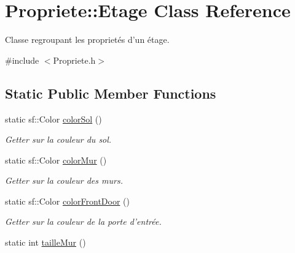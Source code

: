 \hypertarget{classPropriete_1_1Etage}{\section{Propriete\-:\-:Etage Class Reference}
\label{classPropriete_1_1Etage}
}


Classe regroupant les proprietés d'un étage.  




{\ttfamily \#include $<$Propriete.\-h$>$}

\subsection*{Static Public Member Functions}
\begin{DoxyCompactItemize}
\item 
\hypertarget{classPropriete_1_1Etage_ae848e727ab5fd61037dbd0267901c350}{static sf\-::\-Color \hyperlink{classPropriete_1_1Etage_ae848e727ab5fd61037dbd0267901c350}{color\-Sol} ()}\label{classPropriete_1_1Etage_ae848e727ab5fd61037dbd0267901c350}

\begin{DoxyCompactList}\small\item\em Getter sur la couleur du sol. \end{DoxyCompactList}\item 
\hypertarget{classPropriete_1_1Etage_a05a40613294e2f95af8ceee2274c89c0}{static sf\-::\-Color \hyperlink{classPropriete_1_1Etage_a05a40613294e2f95af8ceee2274c89c0}{color\-Mur} ()}\label{classPropriete_1_1Etage_a05a40613294e2f95af8ceee2274c89c0}

\begin{DoxyCompactList}\small\item\em Getter sur la couleur des murs. \end{DoxyCompactList}\item 
\hypertarget{classPropriete_1_1Etage_a0916c5ff06eae729bb13d10ef33d0eb7}{static sf\-::\-Color \hyperlink{classPropriete_1_1Etage_a0916c5ff06eae729bb13d10ef33d0eb7}{color\-Front\-Door} ()}\label{classPropriete_1_1Etage_a0916c5ff06eae729bb13d10ef33d0eb7}

\begin{DoxyCompactList}\small\item\em Getter sur la couleur de la porte d'entrée. \end{DoxyCompactList}\item 
\hypertarget{classPropriete_1_1Etage_ad23dd2bd5e2e686efd6fbadc244eb1bc}{static int \hyperlink{classPropriete_1_1Etage_ad23dd2bd5e2e686efd6fbadc244eb1bc}{taille\-Mur} ()}\label{classPropriete_1_1Etage_ad23dd2bd5e2e686efd6fbadc244eb1bc}


\end{DoxyCompactItemize}
